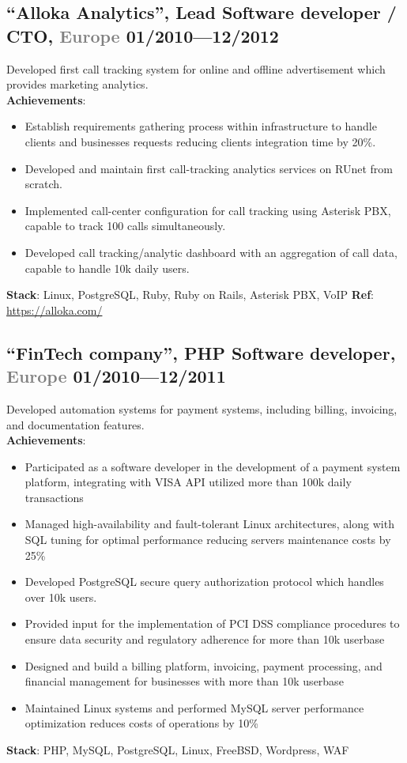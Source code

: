 \documentclass[9pt]{extarticle}
\newcommand{\datedsubsection}[2]{%
  \subsection[#1]{\small\bfseries #1 \hfill\small #2}%
}
\begin{document}
\datedsubsection{``Alloka Analytics'', \textbf{Lead Software developer /  CTO}, \textcolor{gray}{Europe}}{01/2010---12/2012}
Developed first call tracking system for online and offline advertisement which provides marketing analytics.\\
\textbf{Achievements}:
\begin{itemize}
  \item{ Establish requirements gathering process within infrastructure to handle clients and businesses requests reducing clients integration time by 20\%. }
  \item{ Developed and maintain first call-tracking analytics services on RUnet from scratch. }
  \item{ Implemented call-center configuration for call tracking using Asterisk PBX, capable to track 100 calls simultaneously. }
  \item{ Developed call tracking/analytic dashboard with an aggregation of call data, capable to handle 10k daily users.  }
\end{itemize}
\textbf{Stack}: Linux, PostgreSQL, Ruby, Ruby on Rails, Asterisk PBX, VoIP
\textbf{Ref}: \href{https://alloka.com/}{https://alloka.com/}

\datedsubsection{``FinTech company'', \textbf{PHP Software developer}, \textcolor{gray}{Europe}}{01/2010---12/2011}
Developed automation systems for payment systems, including billing, invoicing, and documentation features.\\
\textbf{Achievements}:
\begin{itemize}
  \item{ Participated as a software developer in the development of a payment system platform, integrating with VISA API utilized more than 100k daily transactions }
  \item{ Managed high-availability and fault-tolerant Linux architectures, along with SQL tuning for optimal performance reducing servers maintenance costs by 25\% }
  \item{ Developed PostgreSQL secure query authorization protocol which handles over 10k users. }
  \item{ Provided input for the implementation of PCI DSS compliance procedures to ensure data security and regulatory adherence for more than 10k userbase }
  \item{ Designed and build a billing platform, invoicing, payment processing, and financial management for businesses with more than 10k userbase}
  \item{ Maintained Linux systems and performed MySQL server performance optimization reduces costs of operations by 10\% }
\end{itemize}
\textbf{Stack}: PHP, MySQL, PostgreSQL, Linux, FreeBSD, Wordpress, WAF
\end{document}
